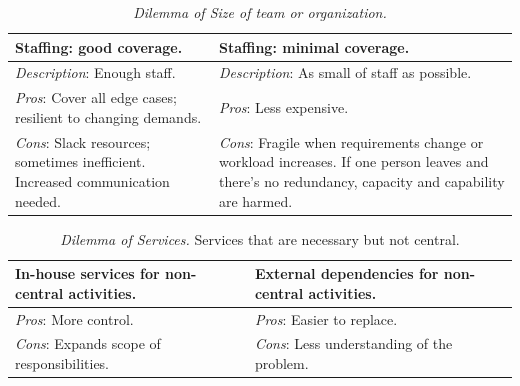 \begin{center}
\begin{table}[H] %
\begin{tabular}{ | m{\dilemmatablewidth}| m{\dilemmatablewidth} | } 
  \hline
  \textbf{Staffing: good coverage.} &
  \textbf{Staffing: minimal coverage.} \\
  \hline
  \textit{Description}: Enough staff. &
  \textit{Description}: As small of staff as possible. \\  
  \hline
  \textit{Pros}: Cover all edge cases; resilient to changing demands. &
  \textit{Pros}: Less expensive. \\
  \hline
  \textit{Cons}: Slack resources; sometimes inefficient. Increased communication needed. & 
  \textit{Cons}: Fragile when requirements change or workload increases. If one person leaves and there's no redundancy, capacity and capability are harmed.  \\
  \hline
\end{tabular}
\caption{
\textit{Dilemma of Size of team or organization.}
}
\label{table:dilemma-org-staff-many-vs-few}
\end{table}
\end{center}



\begin{center}
\begin{table}[H] %
\begin{tabular}{ | m{\dilemmatablewidth}| m{\dilemmatablewidth} | } 
  \hline
  \textbf{In-house services for non-central activities.} &
  \textbf{External dependencies for non-central activities.} \\
  \hline
  \textit{Pros}: More control. &
  \textit{Pros}: Easier to replace. \\
  \hline
  \textit{Cons}: Expands scope of responsibilities. & 
  \textit{Cons}: Less understanding of the problem.  \\
  \hline
\end{tabular}
\caption{
\textit{Dilemma of Services.}
Services that are necessary but not central.
}
\label{table:dilemma-org-inhouse-vs-external}
\end{table}
\end{center}

